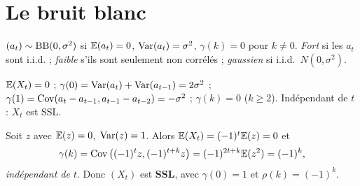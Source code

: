 \documentclass[11pt]{report}
\begin{document}
\section{Le bruit blanc}
\begin{definition}
$(a_t)\sim\operatorname{BB}(0,\sigma^2)$ si $\mathbb{E}(a_t)=0$, $\operatorname{Var}(a_t)=\sigma^2$, $\gamma(k)=0$ pour $k\ne0$.
\emph{Fort} si les $a_t$ sont i.i.d. ; \emph{faible} s'ils sont seulement non corrélés ;
\emph{gaussien} si i.i.d.\ $N(0,\sigma^2)$.
\end{definition}
\begin{exemple}[$X_t=a_t-a_{t-1}$]
$\mathbb{E}(X_t)=0$ ; $\gamma(0)=\operatorname{Var}(a_t)+\operatorname{Var}(a_{t-1})=2\sigma^2$ ;
$\gamma(1)=\operatorname{Cov}(a_t-a_{t-1},a_{t-1}-a_{t-2})=-\sigma^2$ ; $\gamma(k)=0$ ($k\ge2$).
Indépendant de $t$ : $X_t$ est SSL.
\end{exemple}
\begin{exemple}[Le processus $X_t=(-1)^t z$ ; $\to$ Q\,B.1]
Soit $z$ avec $\mathbb{E}(z)=0$, $\operatorname{Var}(z)=1$. Alors $\mathbb{E}(X_t)=(-1)^t\mathbb{E}(z)=0$ et
\[
\gamma(k)=\operatorname{Cov}\big((-1)^tz,(-1)^{t+k}z\big)=(-1)^{2t+k}\mathbb{E}(z^2)=(-1)^k,
\]
\emph{indépendant de $t$}. Donc $(X_t)$ est \textbf{SSL}, avec $\gamma(0)=1$ et
$\rho(k)=(-1)^k$.
\end{exemple}
\end{document}
